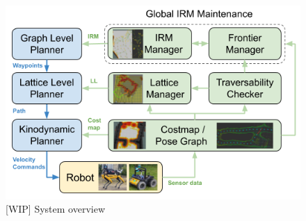 \documentclass{article}
\newcommand{\ph}[1]{{\textbf{#1}:}} %
\begin{document}
\begin{figure}[t!]
  \centering
  \includegraphics[width=.6\textwidth]{figures/SystemOverview.png}
  \caption{[WIP] System overview}
  \label{fig:system_overview}
\end{figure}




\end{document}
